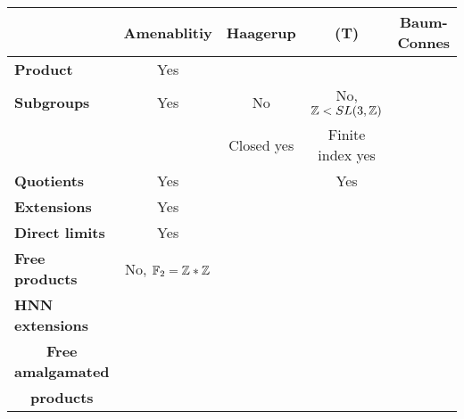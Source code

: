 \begin{table}[h]
\begin{tabular}{c|c|c|c|c|}
\cline{2-5}
                                                         & \textbf{Amenablitiy} & \textbf{Haagerup} & \textbf{(T)}            & \textbf{Baum-Connes}  \\ \hline
\multicolumn{1}{|l|}{\textbf{Product}}                   &            Yes          &                   &                      &                       \\ \hline
\multicolumn{1}{|l|}{\textbf{Subgroups}}                 &            Yes          &       No          & No, $\mathbb Z < SL(3,\mathbb Z)$   &                       \\ 
\multicolumn{1}{|l|}{}                                   &                         &   Closed yes      & Finite index yes   &                       \\ \hline
\multicolumn{1}{|l|}{\textbf{Quotients}}                 &            Yes          &                   &         Yes          &                       \\ \hline
\multicolumn{1}{|l|}{\textbf{Extensions}}                &            Yes          &                   &                      &                       \\ \hline
\multicolumn{1}{|l|}{\textbf{Direct limits}}             &            Yes          &                   &                      &                       \\ \hline
\multicolumn{1}{|l|}{\textbf{Free products}}             &No, $\mathbb F_2 = \mathbb Z \ast \mathbb Z$   &           &                      &                       \\ \hline
\multicolumn{1}{|l|}{\textbf{HNN extensions}}            &                      &                      &                      &                       \\ \hline
\multicolumn{1}{|c|}{\textbf{Free amalgamated }}         &                      &                      &                      &                       \\ 
\multicolumn{1}{|c|}{\textbf{ products}}                 &                      &                      &                      &                       \\ 
\hline
\end{tabular}
\end{table}

